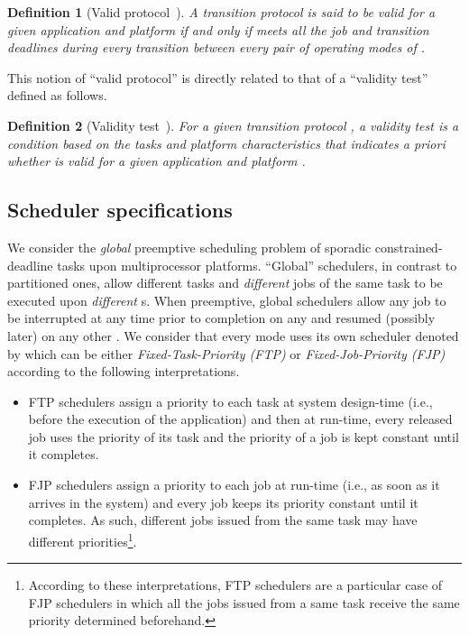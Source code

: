 \documentclass{article}
\newtheorem{Definition}{Definition}
\newtheorem{validity test}{Validity Test}
\begin{document}
\begin{Definition}[Valid protocol~\cite{NelisGoossensAndersson:09}]
A transition protocol  is said to be \emph{valid} for a given application  and platform  if and only if  meets all the job and transition deadlines during every transition between every pair of operating modes of . 
\end{Definition}

This notion of ``valid protocol'' is directly related to that of a ``validity test'' defined as follows. 

\begin{Definition}[Validity test~\cite{NelisGoossensAndersson:09}]
For a given transition protocol , a validity test is a condition based on the tasks and platform characteristics that indicates \emph{a priori} whether  is valid for a given application  and platform . 
\end{Definition}

\subsection{Scheduler specifications}
\label{sec:Multimode:scheduler_specifications}

We consider the \emph{global} preemptive scheduling problem of sporadic constrained-deadline tasks upon multiprocessor platforms. ``Global'' schedulers, in contrast to partitioned ones, allow different tasks and \emph{different} jobs of the same task to be executed upon \emph{different} s. When preemptive, global schedulers allow any job to be interrupted at any time prior to completion on any  and resumed (possibly later) on any other . We consider that every mode  uses its own scheduler denoted by  which can be either {\em Fixed-Task-Priority (FTP)} or {\em Fixed-Job-Priority (FJP)} according to the following interpretations.
\begin{itemize}
\item FTP schedulers assign a priority to each task at system design-time (i.e., before the execution of the application) and then at run-time, every released job uses the priority of its task  and the priority of a job is kept constant until it completes.  
\item FJP schedulers assign a priority to each job at run-time (i.e., as soon as it arrives in the system) and every job keeps its priority constant until it completes. As such, different jobs issued from the same task may have different priorities\footnote{According to these interpretations, FTP schedulers are a particular case of FJP schedulers in which all the jobs issued from a same task receive the same priority determined beforehand.}. 
\end{itemize}
\end{document}
